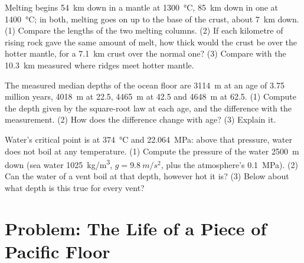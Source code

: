 \begin{exercise}[$\star\star\star$]\label{exo:g11:ocean-ridges:13}
Melting begins \qty{54}{km} down in a mantle at \qty{1300}{\celsius},
\qty{85}{km} down in one at \qty{1400}{\celsius}; in both, melting goes on up
to the base of the crust, about \qty{7}{km} down. (1) Compare the lengths of
the two melting columns. (2) If each kilometre of rising rock gave the same
amount of melt, how thick would the crust be over the hotter mantle, for a
\qty{7.1}{km} crust over the normal one? (3) Compare with the \qty{10.3}{km}
measured where ridges meet hotter mantle.
\end{exercise}

\begin{exercise}[$\star\star\star$]\label{exo:g11:ocean-ridges:14}
The measured median depths of the ocean floor are \qty{3114}{m} at an age of
\num{3.75} million years, \qty{4018}{m} at \num{22.5}, \qty{4465}{m} at
\num{42.5} and \qty{4648}{m} at \num{62.5}. (1) Compute the depth given by the
square-root law at each age, and the difference with the measurement. (2)
How does the difference change with age? (3) Explain it.
\end{exercise}

\begin{exercise}[$\star\star\star$]\label{exo:g11:ocean-ridges:15}
Water's critical point is at \qty{374}{\celsius} and \qty{22.064}{MPa}: above
that pressure, water does not boil at any temperature. (1) Compute the
pressure of the water \qty{2500}{m} down (sea water \qty{1025}{kg/m^3},
$g = \qty{9.8}{m/s^2}$, plus the atmosphere's \qty{0.1}{MPa}). (2) Can the
water of a vent boil at that depth, however hot it is? (3) Below about what
depth is this true for every vent?
\end{exercise}

\section{Problem: The Life of a Piece of Pacific Floor}

